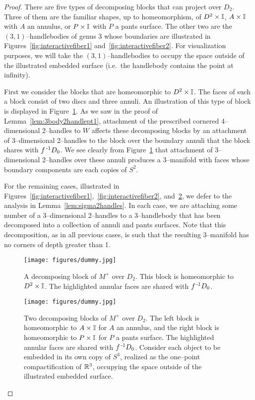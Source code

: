 \begin{proof}
	There are five types of decomposing blocks that can project over $D_2$.
	Three of them are the familiar shapes, up to homeomorphism, of $D^2\times\mathbb{I}$, $A\times\mathbb{I}$ with $A$ an annulus, or $P\times\mathbb{I}$ with $P$ a pants surface.
	The other two are the $(3,1)$--handlebodies of genus 3 whose boundaries are illustrated in Figures~\ref{fig:interactivefiber1} and~\ref{fig:interactivefiber2}.
	For visualization purposes, we will take the $(3,1)$--handlebodies to occupy the space outside of the illustrated embedded surface (i.e.\ the handlebody contains the point at infinity).
	
	First we consider the blocks that are homeomorphic to $D^2\times\mathbb{I}$.
	The faces of such a block consist of two discs and three annuli.
	An illustration of this type of block is displayed in Figure~\ref{fig:blocks1}.
	As we saw in the proof of Lemma~\ref{lem:3body2handlept1}, attachment of the prescribed cornered 4--dimensional 2--handles to $W$ affects these decomposing blocks by an attachment of 3--dimensional 2--handles to the block over the boundary annuli that the block shares with $f^{\,\text{-}1} D_0$.
	We see clearly from Figure~\ref{fig:blocks1} that attachment of 3--dimensional 2--handles over these annuli produces a 3--manifold with faces whose boundary components are each copies of $S^2$.
	
	For the remaining cases, illustrated in Figures~\ref{fig:interactivefiber1},~\ref{fig:interactivefiber2}, and~\ref{fig:blocks2}, we defer to the analysis in Lemma~\ref{lem:sigma2handles}.
	In each case, we are attaching some number of a 3--dimensional 2--handles to a 3--handlebody that has been decomposed into a collection of annuli and pants surfaces.
	Note that this decomposition, as in all previous cases, is such that the resulting 3--manifold has no corners of depth greater than 1.
	
	\begin{figure}
		\centering
		\caption{A decomposing block of $M^+$ over $D_2$.  This block is homeomorphic to $D^2\times\mathbb{I}$.  The highlighted annular faces are shared with $f^{\,\text{-}1} D_0$.}
		\texttt{[image: figures/dummy.jpg]}
		\label{fig:blocks1}
	\end{figure}
	
	
	\begin{figure}
		\centering
		\caption{Two decomposing blocks of $M^+$ over $D_2$.  The left block is homeomorphic to $A\times\mathbb{I}$ for $A$ an annulus, and the right block is homeomorphic to $P\times\mathbb{I}$ for $P$ a pants surface.  The highlighted annular faces are shared with $f^{\,\text{-}1} D_0$.  Consider each object to be embedded in its own copy of $S^3$, realized as the one--point compactification of $\mathbb{R}^3$, occupying the space outside of the illustrated embedded surface.}
		\texttt{[image: figures/dummy.jpg]}
		\label{fig:blocks2}
	\end{figure}
\end{proof}

